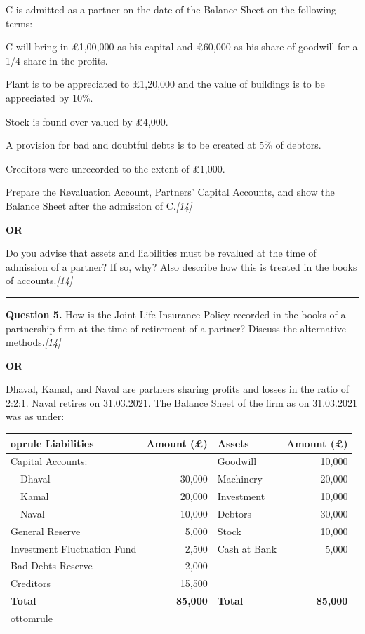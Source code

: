 \documentclass[11pt,a4paper]{article}
\newcommand{\pts}[1]{\hfill   \textit{[#1]}}
\begin{document}
\noindent C is admitted as a partner on the date of the Balance Sheet on the following terms:

\begin{parts}
  \item C will bring in \pounds 1,00,000 as his capital and \pounds 60,000 as his share of goodwill for a 1/4 share in the profits.
  \item Plant is to be appreciated to \pounds 1,20,000 and the value of buildings is to be appreciated by 10\%.
  \item Stock is found over-valued by \pounds 4,000.
  \item A provision for bad and doubtful debts is to be created at 5\% of debtors.
  \item Creditors were unrecorded to the extent of \pounds 1,000.
\end{parts}
Prepare the Revaluation Account, Partners' Capital Accounts, and show the Balance Sheet after the admission of C.\pts{14}

\centerline{   \textbf{OR}}

Do you advise that assets and liabilities must be revalued at the time of admission of a partner? If so, why? Also describe how this is treated in the books of accounts.\pts{14}

\medskip\rule{\linewidth}{0.2pt}


\newpage




\noindent   \textbf{Question 5.}
How is the Joint Life Insurance Policy recorded in the books of a partnership firm at the time of retirement of a partner? Discuss the alternative methods.\pts{14}

\centerline{   \textbf{OR}}

Dhaval, Kamal, and Naval are partners sharing profits and losses in the ratio of 2:2:1. Naval retires on 31.03.2021. The Balance Sheet of the firm as on 31.03.2021 was as under:


\begin{center}

\begin{tabular}{lr|lr}
 oprule
   \textbf{Liabilities} &   \textbf{Amount (\pounds)} &   \textbf{Assets} &   \textbf{Amount (\pounds)} \\
\midrule
Capital Accounts: & & Goodwill & 10,000 \\
~~Dhaval & 30,000 & Machinery & 20,000 \\
~~Kamal & 20,000 & Investment & 10,000 \\
~~Naval & 10,000 & Debtors & 30,000 \\
General Reserve & 5,000 & Stock & 10,000 \\
Investment Fluctuation Fund & 2,500 & Cash at Bank & 5,000 \\
Bad Debts Reserve & 2,000 & & \\
Creditors & 15,500 & & \\
\midrule
   \textbf{Total} &   \textbf{85,000} &   \textbf{Total} &   \textbf{85,000} \\
ottomrule
\end{tabular}
\end{center}
\end{document}

